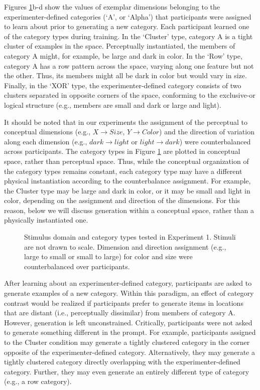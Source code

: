 \documentclass[12pt]{article}
\newcommand\inputpgf[2]{{
\let\pgfimageWithoutPath\pgfimage
\renewcommand{\pgfimage}[2][]{\pgfimageWithoutPath[##1]{#1/##2}}

}}
\begin{document}
\begin{flushleft}
Figures \ref{fig:e1-conditions}b-d show the values of exemplar dimensions
belonging to the experimenter-defined categories (`A', or `Alpha') that
participants were assigned to learn about prior to generating a new category.
Each participant learned one of the category types during training. In the
`Cluster' type, category A is a tight cluster of examples in the space.
Perceptually instantiated, the members of category A might, for example, be
large and dark in color. In the `Row' type, category A has a row pattern across
the space, varying along one feature but not the other. Thus, its members might
all be dark in color but would vary in size. Finally, in the `XOR' type, the
experimenter-defined category consists of two clusters separated in opposite
corners of the space, conforming to the exclusive-or logical structure (e.g.,
members are small and dark or large and light).

It should be noted that in our experiments the assignment of the perceptual
to conceptual dimensions (e.g., $X \rightarrow Size$, $Y \rightarrow Color$) and the direction of variation along each dimension (e.g., $dark
\rightarrow light$ or $light \rightarrow dark$) were counterbalanced across
participants. The category types in Figure \ref{fig:e1-conditions} are plotted
in conceptual space, rather than perceptual space. Thus, while the
conceptual organization of the category types remains constant, each category
type may have a different physical instantiation according to the counterbalance
assignment. For example, the Cluster type may be large and dark in color, or it
may be small and light in color, depending on the assignment and direction of
the dimensions. For this reason, below we will discuss generation within a
conceptual space, rather than a physically instantiated one.

\begin{figure}
    \begin{center} \inputpgf{figs/}{e1-conditions.pgf}
    \caption{Stimulus domain and category types tested in Experiment 1. Stimuli
are not drawn to scale. Dimension and direction assignment (e.g., large to small or small to large) for color and size were counterbalanced over participants.}
    \label{fig:e1-conditions}
    \end{center}
\end{figure}

After learning about an experimenter-defined category, participants are asked to
generate examples of a new category. Within this paradigm, an effect of category
contrast would be realized if participants prefer to generate items in locations
that are distant (i.e., perceptually dissimilar) from members of category A.
However, generation is left unconstrained. Critically, participants were not
asked to generate something different in the prompt. For example, participants
assigned to the Cluster condition may generate a tightly clustered category in
the corner opposite of the experimenter-defined category. Alternatively, they
may generate a tightly clustered category directly overlapping with the
experimenter-defined category. Further, they may even generate an entirely
different type of category (e.g., a row category).


\end{flushleft}
\end{document}
